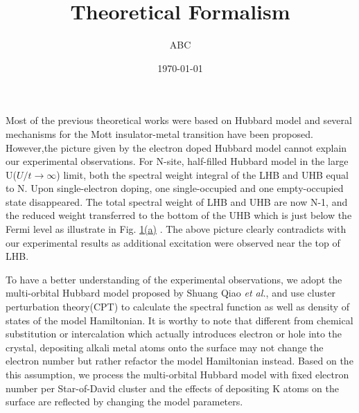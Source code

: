 \documentclass[aps,prl,twocolumn,superscriptaddress]{revtex4}
\begin{document}
\title{Theoretical Formalism}

\author{ABC}
\date{\today}

\maketitle

Most of the previous theoretical works were based on Hubbard model and several mechanisms for the Mott insulator-metal transition have been proposed. However,the picture given by the electron doped Hubbard model cannot explain our experimental observations. For N-site, half-filled Hubbard model in the large U($U/t \rightarrow \infty$) limit, both the spectral weight integral of the LHB and UHB equal to N. Upon single-electron doping, one single-occupied and one empty-occupied state disappeared. The total spectral weight of LHB and UHB are now N-1, and the reduced weight transferred to the bottom of the UHB which is just below the Fermi level as illustrate in Fig. \hyperref[fig:TheoreticalFormalism]{1(a)} \cite{PhysRevLett.67.1035,PhysRevB.48.3916,PhysRevB.48.16857}. The above picture clearly contradicts with our experimental results as additional excitation were observed near the top of LHB.

To have a better understanding of the experimental observations, we adopt the multi-orbital Hubbard model proposed by Shuang Qiao \emph{et al.}, \cite{PhysRevX.7.041054} and use cluster perturbation theory(CPT) \cite{PhysRevLett.84.522,PhysRevB.48.418} to calculate the spectral function as well as density of states of the model Hamiltonian. It is worthy to note that different from chemical substitution or intercalation which actually introduces electron or hole into the crystal, depositing alkali metal atoms onto the surface may not change the electron number but rather refactor the model Hamiltonian instead. Based on the this assumption, we process the multi-orbital Hubbard model with fixed electron number per Star-of-David cluster and the effects of depositing K atoms on the surface are reflected by changing the model parameters.
\end{document}
